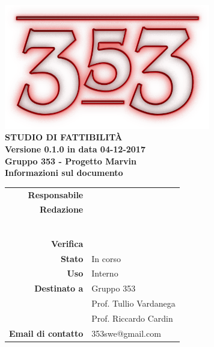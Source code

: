 \documentclass[openany, a4paper, 12pt]{report}
\begin{document}
\begin{titlepage}
	\centering
	\vfill
	{
		\bfseries
		\vskip2cm
		\includegraphics[width=9cm]{../../common/images/logo.png} \\
		\vfill
		\Huge{STUDIO DI FATTIBILITÀ}\\
		\vfill
		\Large Versione 0.1.0 in data 04-12-2017\\
		\large Gruppo 353 - Progetto Marvin\\
		\vfill
	\normalsize Informazioni sul documento\\
\begin{table}[htbp]
	\centering
	\renewcommand\arraystretch{1.2}
	\begin{tabular}{r|l}
		\hline
		\textbf{Responsabile}	& \\
		
		\textbf{Redazione} 		& \Davide\\
								& \Elena\\
								& \Gianluca\\
								& \Mirco\\
								& \Parwinder\\
								& \Riccardo\\
								& \Valentina\\
								
		\textbf{Verifica} 		& \\		
							
		\textbf{Stato} 			& In corso\\
		
		\textbf{Uso}			& Interno\\
		
		\textbf{Destinato a}   	& Gruppo 353\\
								& Prof. Tullio Vardanega\\
								& Prof. Riccardo Cardin\\
		
		\textbf{Email di contatto}	& 353swe@gmail.com
	\end{tabular}
\end{table}
		\vfill
	}    
\end{titlepage}

\tableofcontents
\newpage
{}









 
\end{document}
